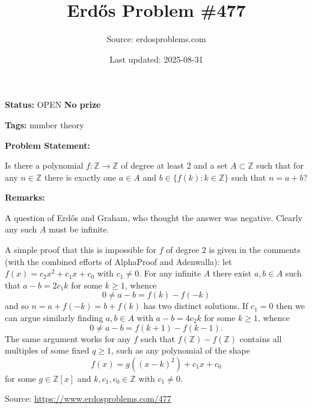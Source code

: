 \documentclass{article}
\title{Erd\H{o}s Problem \#477}
\date{Last updated: 2025-08-31}
\author{Source: erdosproblems.com}
\begin{document}
\maketitle

\noindent\textbf{Status:} OPEN \quad \textbf{No prize}

\noindent\textbf{Tags:} number theory

\medskip
\noindent\textbf{Problem Statement:}

Is there a polynomial $f:\mathbb{Z}\to \mathbb{Z}$ of degree at least $2$ and a set $A\subset \mathbb{Z}$ such that for any $n\in \mathbb{Z}$ there is exactly one $a\in A$ and $b\in \{ f(k) : k\in\mathbb{Z}\}$ such that $n=a+b$?

\bigskip
\noindent\textbf{Remarks:}

A question of Erd\H{o}s and Graham, who thought the answer was negative. Clearly any such $A$ must be infinite.

A simple proof that this is impossible for $f$ of degree $2$ is given in the comments (with the combined efforts of AlphaProof and Adenwalla): let $f(x)=c_2x^2+c_1x+c_0$ with $c_1\neq 0$. For any infinite $A$ there exist $a,b\in A$ such that $a-b=2c_1k$ for some $k\geq 1$, whence\[0\neq a-b=f(k)-f(-k)\]and so $n=a+f(-k)=b+f(k)$ has two distinct solutions. If $c_1=0$ then we can argue similarly finding $a,b\in A$ with $a-b=4c_2k$ for some $k\geq 1$, whence\[0\neq a-b=f(k+1)-f(k-1).\]The same argument works for any $f$ such that $f(\mathbb{Z})-f(\mathbb{Z})$ contains all multiples of some fixed $q\geq 1$, such as any polynomial of the shape\[f(x)=g((x-k)^2)+c_1x+c_0\]for some $g\in \mathbb{Z}[x]$ and $k,c_1,c_0\in \mathbb{Z}$ with $c_1\neq 0$.

\bigskip
\noindent\small{Source: \url{https://www.erdosproblems.com/477}}
\end{document}
